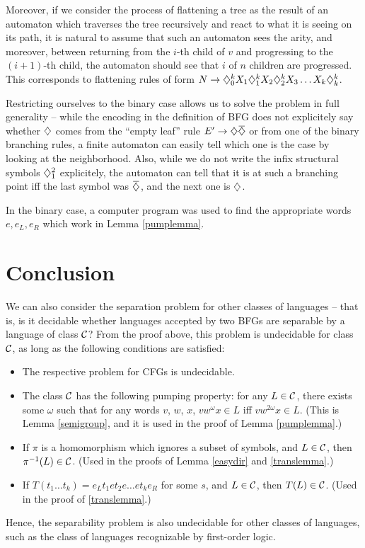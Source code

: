 \documentclass{article}
\begin{document}
Moreover, if we consider the process of flattening a tree as the result of an
automaton which traverses the tree recursively and react to what it is seeing on its path,
it is natural to assume that such an automaton sees the arity, and moreover, 
between returning from the $i$-th child of $v$ and progressing to the $(i+1)$-th child,
the automaton should see that $i$ of $n$ children are progressed. This corresponds
to flattening rules of form $N \rightarrow \diamondsuit_0^k X_1 \diamondsuit_1^k X_2 \diamondsuit_2^k X_3 \ldots X_k \diamondsuit_k^k$.

Restricting ourselves to the binary case allows us to solve the problem in full
generality -- while the encoding in the definition of BFG does not explicitely 
say whether $\diamondsuit$ comes from 
the ``empty leaf'' rule $E' \ra \oa\ca$ or from one of the binary branching rules,
a finite automaton can easily tell which one is the case by looking at the neighborhood.
Also, while we do not write the infix structural symbols $\diamondsuit_1^2$ explicitely,
the automaton can tell that it is at such a branching point iff the last symbol was $\ca$,
and the next one is $\diamondsuit$.

In the binary case, a computer program was used to find the 
appropriate words $e,e_L,e_R$ which work in Lemma \ref{pumplemma}.

\section{Conclusion}
We can also consider the separation problem for other classes of languages --
that is, is it decidable whether languages accepted by two BFGs are separable
by a language of class ${\mathcal C}$? From the proof above, this problem is undecidable
for class ${\mathcal C}$, as long as the following conditions are satisfied:

\begin{itemize}
\item The respective problem for CFGs is undecidable.
\item The class ${\mathcal C}$ has the following pumping property: for any $L \in {\mathcal C}$,
there exists some $\omega$ such that for any words $v$, $w$, $x$,
$v{w^\omega}x \in L$ iff $v{w^{2\omega}}x \in L$. (This is Lemma 
\ref{semigroup}, and it is used in the proof of Lemma \ref{pumplemma}.)
\item If $\pi$ is a homomorphism which ignores a subset of symbols, 
and $L \in {\mathcal C}$, then $\pi^{-1}(L) \in {\mathcal C}$. (Used in the proofs of Lemma 
\ref{easydir} and \ref{translemma}.)
\item If $T(t_1 \ldots t_k) = e_L t_1 e t_2 e \ldots e t_k e_R$
for some $s$, and $L \in {\mathcal C}$, then $T(L) \in {\mathcal C}$. (Used in the proof of \ref{translemma}.)
\end{itemize}

Hence, the separability problem is also undecidable for other classes of languages,
such as the class of languages recognizable by first-order logic.



\end{document}
